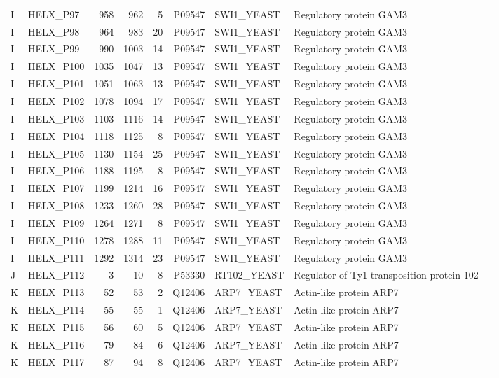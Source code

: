 \begin{longtable}{@{}llrrrrllp{5.2cm}@{}}
  I & HELX_P97 & 958 & 962 & 5 & P09547 & SWI1_YEAST & Regulatory protein GAM3 \\
  I & HELX_P98 & 964 & 983 & 20 & P09547 & SWI1_YEAST & Regulatory protein GAM3 \\
  I & HELX_P99 & 990 & 1003 & 14 & P09547 & SWI1_YEAST & Regulatory protein GAM3 \\
  I & HELX_P100 & 1035 & 1047 & 13 & P09547 & SWI1_YEAST & Regulatory protein GAM3 \\
  I & HELX_P101 & 1051 & 1063 & 13 & P09547 & SWI1_YEAST & Regulatory protein GAM3 \\
  I & HELX_P102 & 1078 & 1094 & 17 & P09547 & SWI1_YEAST & Regulatory protein GAM3 \\
  I & HELX_P103 & 1103 & 1116 & 14 & P09547 & SWI1_YEAST & Regulatory protein GAM3 \\
  I & HELX_P104 & 1118 & 1125 & 8 & P09547 & SWI1_YEAST & Regulatory protein GAM3 \\
  I & HELX_P105 & 1130 & 1154 & 25 & P09547 & SWI1_YEAST & Regulatory protein GAM3 \\
  I & HELX_P106 & 1188 & 1195 & 8 & P09547 & SWI1_YEAST & Regulatory protein GAM3 \\
  I & HELX_P107 & 1199 & 1214 & 16 & P09547 & SWI1_YEAST & Regulatory protein GAM3 \\
  I & HELX_P108 & 1233 & 1260 & 28 & P09547 & SWI1_YEAST & Regulatory protein GAM3 \\
  I & HELX_P109 & 1264 & 1271 & 8 & P09547 & SWI1_YEAST & Regulatory protein GAM3 \\
  I & HELX_P110 & 1278 & 1288 & 11 & P09547 & SWI1_YEAST & Regulatory protein GAM3 \\
  I & HELX_P111 & 1292 & 1314 & 23 & P09547 & SWI1_YEAST & Regulatory protein GAM3 \\
  J & HELX_P112 & 3 & 10 & 8 & P53330 & RT102_YEAST & Regulator of Ty1 transposition protein 102 \\
  K & HELX_P113 & 52 & 53 & 2 & Q12406 & ARP7_YEAST & Actin-like protein ARP7 \\
  K & HELX_P114 & 55 & 55 & 1 & Q12406 & ARP7_YEAST & Actin-like protein ARP7 \\
  K & HELX_P115 & 56 & 60 & 5 & Q12406 & ARP7_YEAST & Actin-like protein ARP7 \\
  K & HELX_P116 & 79 & 84 & 6 & Q12406 & ARP7_YEAST & Actin-like protein ARP7 \\
  K & HELX_P117 & 87 & 94 & 8 & Q12406 & ARP7_YEAST & Actin-like protein ARP7 \\

\end{longtable}
